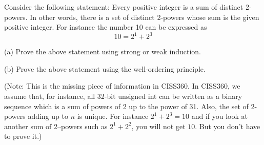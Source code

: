 Consider the following statement:
Every positive integer is a sum of distinct 2-powers.
In other words, there is a set of distinct 2-powers whose sum is the 
given positive integer.
For instance the number 10 can be expressed as
\[
10 = 2^1 + 2^3
\]

(a)
Prove the above statement using strong or weak induction.

(b)
Prove the above statement using the well-ordering principle.

(Note: This is the missing piece of information in CISS360.
In CISS360, we assume that, for instance, all 32-bit unsigned int
can be written as a binary sequence which is a sum of powers of 2
up to the power of 31.
Also, the set of 2-powers adding up to $n$ is unique.
For instance $2^1 + 2^3 = 10$ and if you look at another
sum of 2--powers such as $2^1 + 2^2$, you will not get $10$.
But you don't have to prove it.)
